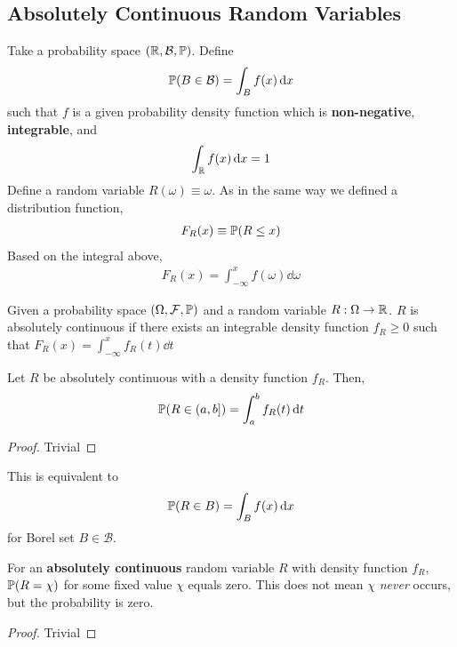 \subsection{Absolutely Continuous Random Variables}
Take a probability space $(\mathbb{R}, \mathcal{B}, \mathbb{P})$. Define
\begin{align}
    \mathbb{P}(B \in \mathcal{B}) = \int_B f(x) \dd{x}
\end{align}
such that $f$ is a given probability density function which is \textbf{non-negative}, \textbf{integrable}, and
\begin{align}
    \int_{\mathbb{R}} f(x) \dd{x} = 1
\end{align}
Define a random variable $R(\omega) \equiv \omega$. As in the same way we defined a distribution function,
\begin{align}
    F_R(x) \equiv \mathbb{P}(R \le x)
\end{align}
Based on the integral above,
\begin{align}
    F_R(x) = \int_{-\infty}^x f(\omega) \dd{\omega}
\end{align}
\begin{definition}
    Given a probability space $(\Omega, \mathcal{F}, \mathbb{P})$ and a random variable $R: \Omega \to \mathbb{R}$. $R$ is absolutely continuous if there exists an integrable density function $f_R \ge 0$ such that $F_R(x) = \int_{-\infty}^x f_R(t) \dd{t}$
\end{definition}
\begin{proposition}
    Let $R$ be absolutely continuous with a density function $f_R$. Then,
    \begin{align}
        \mathbb{P}(R \in (a,b]) = \int_{a}^b f_R(t) \dd{t}
    \end{align}
    \begin{proof}
        Trivial
    \end{proof}
    This is equivalent to
    \begin{align}
        \mathbb{P}(R \in B) = \int_B f(x) \dd{x}
    \end{align}
    for Borel set $B \in \mathcal{B}$.
\end{proposition}
\begin{lemma}
    For an \textbf{absolutely continuous} random variable $R$ with density function $f_R$, $\mathbb{P}\qty(R = \chi)$ for some fixed value $\chi$ equals zero. This does not mean $\chi$ \textit{never} occurs, but the probability is zero.
    \begin{proof}
        Trivial
    \end{proof}
\end{lemma}
